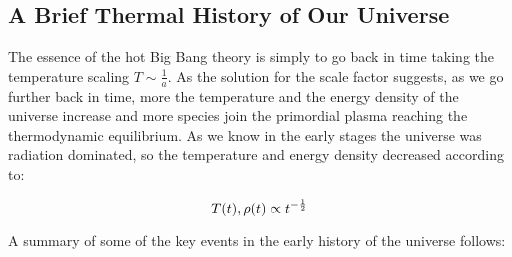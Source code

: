 \subsection{A Brief Thermal History of Our Universe}\label{ss:brief_thermal_history}

The essence of the hot Big Bang theory is simply to go back in time taking
the temperature scaling $T \sim \frac{1}{a}$. As the solution for the scale
factor suggests, as we go further back in time, more the temperature and
the energy density of the universe increase and more species join the
primordial plasma reaching the thermodynamic equilibrium. As we know in the
early stages the universe was radiation dominated, so the temperature and
energy density decreased according to:

\begin{equation}
        T\qty(t), \rho\qty(t) \propto t^{-\frac{1}{2}}
\end{equation}

A summary of some of the key events in the early history of the universe
follows:

